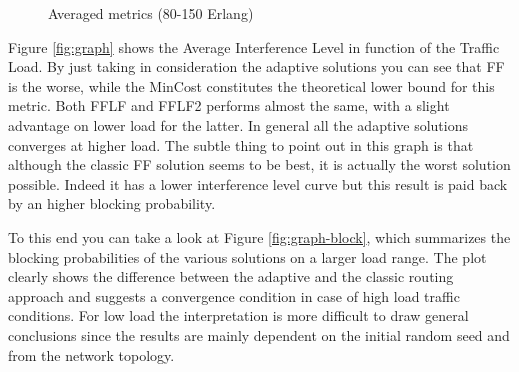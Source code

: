 \documentclass[9pt,twocolumn]{article}
\begin{document}
\begin{figure}[!htb]
	\label{fig:results2}
	\caption{Averaged metrics (80-150 Erlang)}
\end{figure}


Figure \ref{fig:graph} shows the Average Interference Level in function of the Traffic Load. By just taking in consideration the adaptive solutions you can see that FF is the worse, while the MinCost constitutes the theoretical lower bound for this metric. Both FFLF and FFLF2 performs almost the same, with a slight advantage on lower load for the latter. In general all the adaptive solutions converges at higher load. The subtle thing to point out in this graph is that although the classic FF solution seems to be best, it is actually the worst solution possible. Indeed it has a lower interference level curve but this result is paid back by an higher blocking probability.

To this end you can take a look at Figure \ref{fig:graph-block}, which summarizes the blocking probabilities of the various solutions on a larger load range. The plot clearly shows the difference between the adaptive and the classic routing approach and suggests a convergence condition in case of high load traffic conditions. For low load the interpretation is more difficult to draw general conclusions since the results are mainly dependent on the initial random seed and from the network topology.
\end{document}
